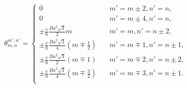 \begin{gather}
	\theta_{m,n}^{m',n'} =
	\begin{cases}
		0                                                                             & \quad m' = m \pm 2, n' = n  ,      \\
		0                                                                             & \quad m' = m \pm 4, n' = n  ,      \\
		\pm \frac{e}{\hbar} \frac{B a^{2} \sqrt{3}}{2} m                      & \quad m' = m , n' = n \pm 2,  \\
		\pm \frac{e}{\hbar} \frac{B a^{2} \sqrt{3}}{4} \left(m \mp \frac{1}{2}\right) & \quad m' = m \mp 1, n' = n \pm 1 , \\
		\pm \frac{e}{\hbar} \frac{B a^{2} \sqrt{3}}{2} (m \mp 1)                      & \quad m' = m \mp 2, n' = n \pm 2,  \\
		\pm \frac{e}{\hbar} \frac{B a^{2} \sqrt{3}}{4} \left(m \mp \frac{3}{2}\right) & \quad m' = m \mp 3, n' = n \pm 1.  \\
	\end{cases}
\end{gather}

